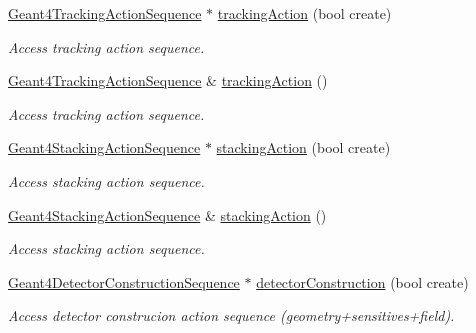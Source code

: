 \begin{DoxyCompactItemize}
\hyperlink{class_d_d4hep_1_1_simulation_1_1_geant4_tracking_action_sequence}{Geant4TrackingActionSequence} $\ast$ \hyperlink{class_d_d4hep_1_1_simulation_1_1_geant4_action_container_a4ff088a46753f37dadc07e22a0436382}{trackingAction} (bool create)
\begin{DoxyCompactList}\small\item\em Access tracking action sequence. \item\end{DoxyCompactList}\item 
\hyperlink{class_d_d4hep_1_1_simulation_1_1_geant4_tracking_action_sequence}{Geant4TrackingActionSequence} \& \hyperlink{class_d_d4hep_1_1_simulation_1_1_geant4_action_container_a39580aa5a9e07279b16b2739efba2608}{trackingAction} ()
\begin{DoxyCompactList}\small\item\em Access tracking action sequence. \item\end{DoxyCompactList}\item 
\hyperlink{class_d_d4hep_1_1_simulation_1_1_geant4_stacking_action_sequence}{Geant4StackingActionSequence} $\ast$ \hyperlink{class_d_d4hep_1_1_simulation_1_1_geant4_action_container_ad9a53bd3401686eeeb711ef467b2a800}{stackingAction} (bool create)
\begin{DoxyCompactList}\small\item\em Access stacking action sequence. \item\end{DoxyCompactList}\item 
\hyperlink{class_d_d4hep_1_1_simulation_1_1_geant4_stacking_action_sequence}{Geant4StackingActionSequence} \& \hyperlink{class_d_d4hep_1_1_simulation_1_1_geant4_action_container_a688c893718ea08ea0c7fe7432506915b}{stackingAction} ()
\begin{DoxyCompactList}\small\item\em Access stacking action sequence. \item\end{DoxyCompactList}\item 
\hyperlink{class_d_d4hep_1_1_simulation_1_1_geant4_detector_construction_sequence}{Geant4DetectorConstructionSequence} $\ast$ \hyperlink{class_d_d4hep_1_1_simulation_1_1_geant4_action_container_a4dba304abe94e83eaef9c22aa196454b}{detectorConstruction} (bool create)
\begin{DoxyCompactList}\small\item\em Access detector construcion action sequence (geometry+sensitives+field). \item\end{DoxyCompactList}\item 

\end{DoxyCompactItemize}
